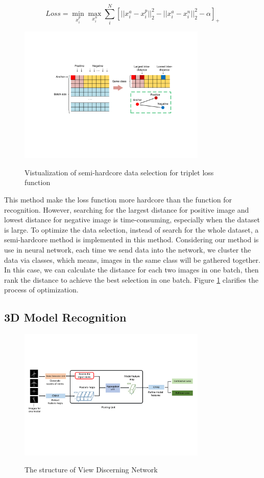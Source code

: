 \documentclass[11pt,onecolumn,letterpaper]{article}
\begin{document}
$$Loss = \min_{x_i^p}\max_{x_i^n} \sum_{i}^N [||x_i^a - x_i^p||_2^2  - ||x_i^a - x_i^n||_2^2 - \alpha]_+$$

\begin{figure}
\centering
\includegraphics[width = 0.8\textwidth]{improve.pdf}
\label{improved}
\caption{Vistualization of semi-hardcore data selection for triplet loss function}
\end{figure}

This method make the loss function more hardcore than the function for recognition. However, searching for the largest distance for positive image and lowest distance for negative image is time-consuming, especially when the dataset is large. To optimize the data selection, instead of search for the whole dataset, a semi-hardcore method is implemented in this method. Considering our method is use in neural network, each time we send data into the network, we cluster the data via classes, which means, images in the same class will be gathered together. In this case, we can calculate the distance for each two images in one batch, then rank the distance to achieve the best selection in one batch. Figure \ref{improved} clarifies the process of optimization.

\subsection{3D Model Recognition}

\begin{figure}[htbp]
\centering
\includegraphics[width = 0.8\textwidth]{procedurepic.pdf}
\label{3d}
\caption{The structure of View Discerning Network}
\end{figure}
\end{document}
